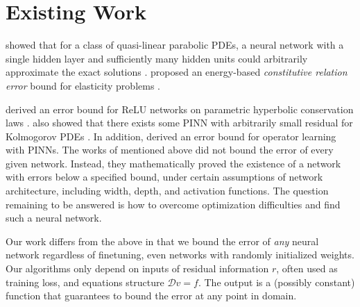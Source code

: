 
\chapter{Existing Work}\label{chapter:existing-work}
    \citeauthor{sirignano2018dgm} showed that for a class of quasi-linear parabolic PDEs, a neural network with a single hidden layer and sufficiently many hidden units could arbitrarily approximate the exact solutions \cite{sirignano2018dgm}.
    \citeauthor{guo2022energy} proposed an energy-based \textit{constitutive relation error} bound for elasticity problems \cite{guo2022energy}.

    \citeauthor{de2022errorhyperbolic} derived an error bound for ReLU networks on parametric hyperbolic conservation laws \cite{de2022errorhyperbolic}.
    \citeauthor{de2022errorkolmogorov} also showed that there exists some PINN with arbitrarily small residual for Kolmogorov PDEs \cite{de2022errorkolmogorov}.
    In addition, \citeauthor{de2022generic} derived an error bound for operator learning with PINNs\cite{de2022generic}.
    The works of \citeauthor{de2022errorhyperbolic} mentioned above did not bound the error of every given network.
    Instead, they mathematically proved the existence of a network with errors below a specified bound, under certain assumptions of network architecture, including width, depth, and activation functions. 
    The question remaining to be answered is how to overcome optimization difficulties and find such a neural network.

    Our work differs from the above in that we bound the error of \textit{any} neural network regardless of finetuning, even networks with randomly initialized weights.
    Our algorithms only depend on inputs of residual information $r$, often used as training loss, and equations structure $\mathcal{D} v = f$.
    The output is a (possibly constant) function that guarantees to bound the error at any point in domain.